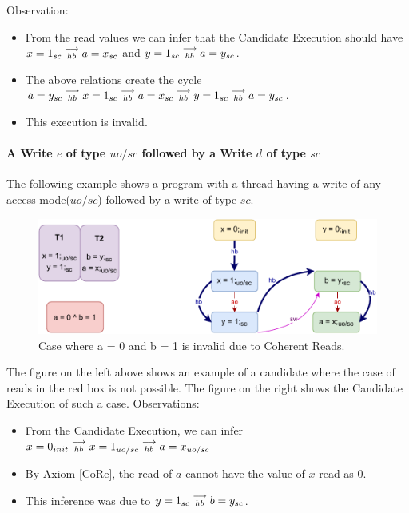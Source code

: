         Observation:
        \begin{itemize}
            \item From the read values we can infer that the Candidate Execution should have $x=1_{sc}\stackrel{\longrightarrow}{_{hb}}a=x_{sc}$ and $y=1_{sc}\stackrel{\longrightarrow}{_{hb}}a=y_{sc}$.
            \item The above relations create the cycle $a=y_{sc}\stackrel{\longrightarrow}{_{hb}}x=1_{sc}\stackrel{\longrightarrow}{_{hb}}a=x_{sc}\stackrel{\longrightarrow}{_{hb}}y=1_{sc}\stackrel{\longrightarrow}{_{hb}}a=y_{sc}$.
            \item This execution is invalid. 
        \end{itemize}


    \paragraph{A Write $e$ of type $uo/sc$ followed by a Write $d$ of type $sc$}
        
        The following example shows a program with a thread having a write of any access mode($uo/sc$) followed by a write of type $sc$.
        \begin{figure}[H]
            \centering
            \includegraphics[scale=0.7]{5.InstructionReordering/4.ValidReorderingCandidate/Example7(Wuo,sc-Wsc).pdf}
            \caption{Case where a = 0 and b = 1 is invalid due to Coherent Reads.}
        \end{figure}
        The figure on the left above shows an example of a candidate where the case of reads in the red box is not possible. 
        The figure on the right shows the Candidate Execution of such a case. 
        Observations:
        \begin{itemize}
            \item From the Candidate Execution, we can infer $x=0_{init}\stackrel{\longrightarrow}{_{hb}}x=1_{uo/sc}\stackrel{\longrightarrow}{_{hb}}a=x_{uo/sc}$
            \item By Axiom \ref{CoRe}, the read of $a$ cannot have the value of $x$ read as $0$. 
            \item This inference was due to $y=1_{sc}\stackrel{\longrightarrow}{_{hb}}b=y_{sc}$.
        \end{itemize}

